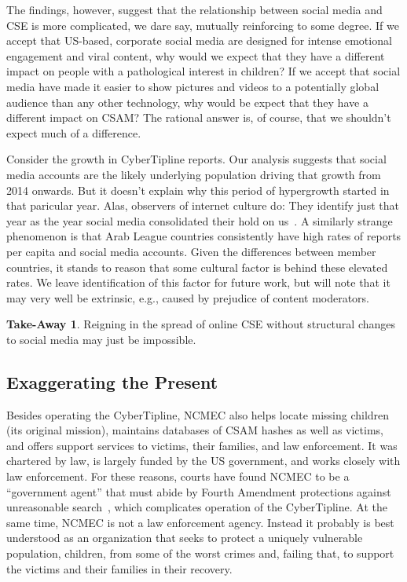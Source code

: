 \documentclass[anonymous,nonacm,screen,12pt]{acmart}
\newcommand\V[1]{{#1}}
\newcommand\V[1]{\textsc{\MakeLowercase{#1}}}
\theoremstyle{definition}
\newtheorem{takeout}{Take-Away}
\begin{document}
The findings, however, suggest that the relationship between social media and
\V{CSE} is more complicated, we dare say, mutually reinforcing to some degree.
If we accept that \V{US}-based, corporate social media are designed for intense
emotional engagement and viral content, why would we expect that they have a
different impact on people with a pathological interest in children? If we
accept that social media have made it easier to show pictures and videos to a
potentially global audience than any other technology, why would be expect that
they have a different impact on \V{CSAM}? The rational answer is, of course,
that we shouldn't expect much of a difference.

Consider the growth in CyberTipline reports. Our analysis suggests that social
media accounts are the likely underlying population driving that growth from
2014 onwards. But it doesn't explain why this period of hypergrowth started in
that paricular year. Alas, observers of internet culture do: They identify just
that year as the year social media consolidated their hold on us~\cite{Cao2024,
Staltz2017}. A similarly strange phenomenon is that Arab League countries
consistently have high rates of reports per capita and social media accounts.
Given the differences between member countries, it stands to reason that some
cultural factor is behind these elevated rates. We leave identification of this
factor for future work, but will note that it may very well be extrinsic, e.g.,
caused by prejudice of content moderators.

\begin{takeout}
Reigning in the spread of online \V{CSE} without structural changes to social
media may just be impossible.
\end{takeout}


\subsection{Exaggerating the Present}

Besides operating the CyberTipline, \V{NCMEC} also helps locate missing children
(its original mission), maintains databases of \V{CSAM} hashes as well as
victims, and offers support services to victims, their families, and law
enforcement. It was chartered by law, is largely funded by the \V{US}
government, and works closely with law enforcement. For these reasons, courts
have found \V{NCMEC} to be a ``government agent'' that must abide by Fourth
Amendment protections against unreasonable
search~\cite{GrossmanPfefferkornea2024}, which complicates operation of the
CyberTipline. At the same time, \V{NCMEC} is not a law enforcement agency.
Instead it probably is best understood as an organization that seeks to protect
a uniquely vulnerable population, children, from some of the worst crimes and,
failing that, to support the victims and their families in their recovery.
\end{document}
